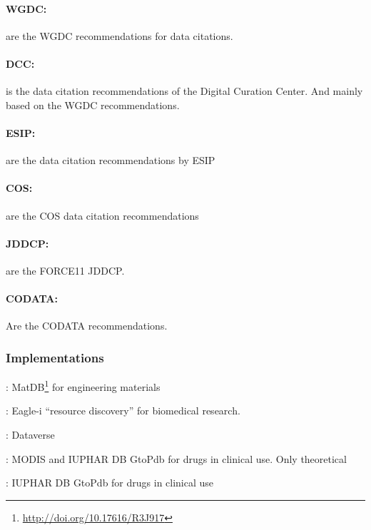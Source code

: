 \documentclass[a4paper,10pt]{article}
\begin{document}
\paragraph{\acrlong{WGDC}:}
\citep{Rauber2015} are the \gls{WGDC} recommendations for data citations.

\paragraph{\acrlong{DCC}:}
\citep{Ball2015} is the data citation recommendations of the Digital Curation Center. And mainly based on the \gls{WGDC} recommendations.

\paragraph{\acrlong{ESIP}:}
\citep{ESIP2012a} are the data citation recommendations by \gls{ESIP}

\paragraph{\acrlong{COS}:}
\citep{COS2015} are the \gls{COS} data citation recommendations

\paragraph{\acrlong{JDDCP}:}
\citep{Altman2015, Rauber2015, Fenner2016, Starr2015} are the FORCE11 \gls{JDDCP}.

\paragraph{\acrlong{CODATA}:}
\citep{CODATA2013} Are the \gls{CODATA} recommendations.

\subsubsection{Implementations}

\citep{Austin2016}: MatDB\footnote{\url{http://doi.org/10.17616/R3J917}} for engineering materials 

\citep{Alawini2017}: Eagle-i ``resource discovery'' for biomedical research.

\citep{Crosas2011}: Dataverse

\citep{Buneman2016}: \gls{MODIS} and IUPHAR DB GtoPdb for drugs in clinical use. Only theoretical

\citep{Buneman2010}: IUPHAR DB GtoPdb for drugs in clinical use
\end{document}
